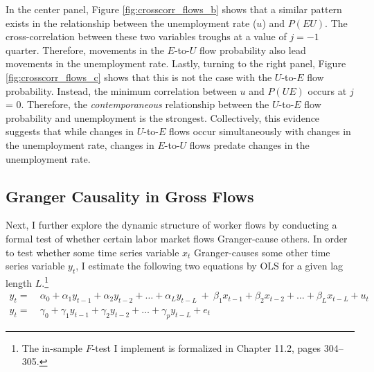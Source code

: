 \documentclass[12pt]{article}
\begin{document}
In the center panel, Figure \ref{fig:crosscorr_flows_b} shows that a similar pattern exists in the relationship between the unemployment rate ($u$) and $P(EU)$. The cross-correlation between these two variables troughs at a value of $j = -1$ quarter. Therefore, movements in the $E$-to-$U$ flow probability also lead movements in the unemployment rate. Lastly, turning to the right panel, Figure \ref{fig:crosscorr_flows_c} shows that this is not the case with the $U$-to-$E$ flow probability. Instead, the minimum correlation between $u$ and $P(UE)$ occurs at $j$ = 0. Therefore, the \textit{contemporaneous} relationship between the $U$-to-$E$ flow probability and unemployment is the strongest. Collectively, this evidence suggests that while changes in $U$-to-$E$ flows occur simultaneously with changes in the unemployment rate, changes in $E$-to-$U$ flows predate changes in the unemployment rate.

\subsection{Granger Causality in Gross Flows}

Next, I further explore the dynamic structure of worker flows by conducting a formal test of whether certain labor market flows Granger-cause others. In order to test whether some time series variable $x_t$ Granger-causes some other time series variable $y_t$, I estimate the following two equations by OLS for a given lag length $L$.\footnote{The in-sample $F$-test I implement is formalized in \cite{Hamilton:1994aa} Chapter 11.2, pages 304--305.}
\begin{align}
y_t = \ & \alpha_0 + \alpha_1 y_{t-1} + \alpha_2 y_{t-2} + \dots + \alpha_L y_{t-L} \ + \ \beta_1 x_{t-1} + \beta_2 x_{t-2} + \dots + \beta_L x_{t-L} + u_t \label{eqn:granger1} \\
y_t = \ & \gamma_0  + \gamma_1 y_{t-1} + \gamma_2 y_{t-2} + \dots + \gamma_p y_{t-L} + e_t \label{eqn:granger2}
\end{align}
\end{document}
